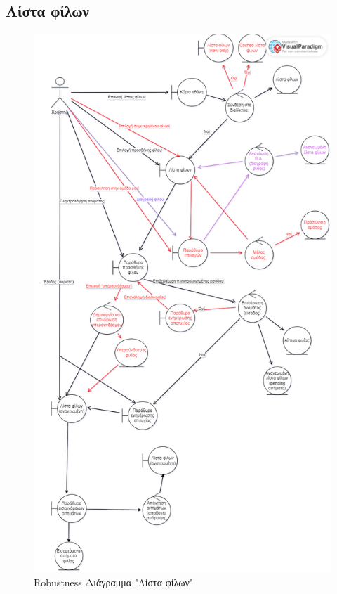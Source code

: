 \subsection{Λίστα φίλων}
\begin{figure}[!htb]
  \begin{center}
    \includegraphics[width=\textwidth]{robust_friends.png}
    \caption{Robustness Διάγραμμα "Λίστα φίλων"}
    \label{}
     \end{center}
\end{figure}
\newpage


